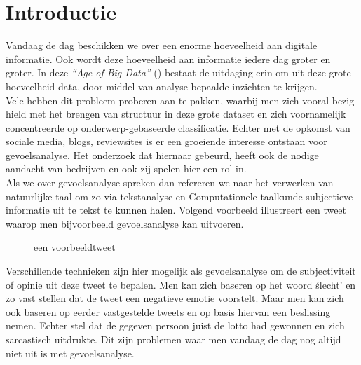\chapter{Introductie}\label{introductie}

Vandaag de dag beschikken we over een enorme hoeveelheid aan digitale informatie. Ook wordt deze hoeveelheid aan informatie iedere dag groter en groter. 
In deze \textit{``Age of Big Data''} (\cite{lohr2012age}) bestaat de uitdaging erin om uit deze grote hoeveelheid data, door middel van analyse bepaalde inzichten te krijgen.
\\
Vele hebben dit probleem proberen aan te pakken, waarbij men zich vooral bezig hield met het brengen van structuur in deze grote dataset en zich voornamelijk concentreerde op onderwerp-gebaseerde classificatie. Echter met de opkomst van sociale media, blogs, reviewsites is er een groeiende interesse ontstaan voor gevoelsanalyse. Het onderzoek dat hiernaar gebeurd, heeft ook de nodige aandacht van bedrijven en ook zij spelen hier een rol in.\\
Als we over gevoelsanalyse spreken dan refereren we naar het verwerken van natuurlijke taal  om zo via tekstanalyse en Computationele taalkunde subjectieve informatie uit te tekst te kunnen halen. Volgend voorbeeld illustreert een tweet waarop men bijvoorbeeld gevoelsanalyse kan uitvoeren.\\

\begin{figure}[h]%
    \centering
    \caption{een voorbeeldtweet}%
\end{figure}
\newline

Verschillende technieken zijn hier mogelijk  als gevoelsanalyse om de subjectiviteit of opinie uit deze tweet te bepalen. Men kan zich baseren op het woord \'slecht' en zo vast stellen dat de tweet een negatieve emotie voorstelt. Maar men kan zich ook baseren op eerder vastgestelde tweets en op basis hiervan een beslissing nemen. Echter stel dat de gegeven persoon juist de lotto had gewonnen en zich sarcastisch uitdrukte. Dit zijn problemen waar men vandaag de dag nog altijd niet uit is met gevoelsanalyse.\\ 

